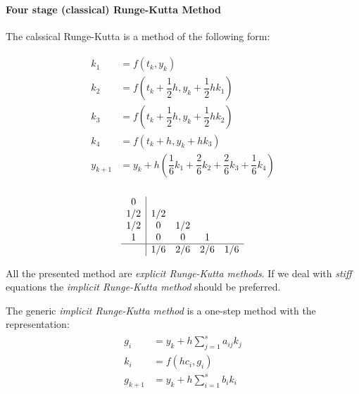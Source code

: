 \paragraph{Four stage (classical) Runge-Kutta Method}
The calssical Runge-Kutta is a method of the following form:

\begin{minipage}{0.45\textwidth}
	\begin{equation*}
	\begin{split}
	\begin{aligned}
	k_1 &= f(t_k,y_k) \\
	k_2 &= f\left( t_k+\dfrac{1}{2}h,y_k+\dfrac{1}{2}hk_1 \right) \\
	k_3 &= f\left( t_k+\dfrac{1}{2}h,y_k+\dfrac{1}{2}hk_2 \right) \\
	k_4 &= f\left( t_k+h,y_k+hk_3 \right) \\
	y_{k+1} &= y_k + h\left( \dfrac{1}{6}k_1 + \dfrac{2}{6}k_2 + \dfrac{2}{6}k_3 + \dfrac{1}{6}k_4 \right) \\
	\end{aligned}
	\end{split}
	\label{eq::4stage_rungekutta}
	\end{equation*}
\end{minipage}
\begin{minipage}{0.45\textwidth}
	\begin{equation}
	\begin{array}
	{c|cccc}
	0      & \\
	1/2    & 1/2 &  \\
	1/2    & 0 & 1/2 \\
	1      & 0 & 0 & 1 \\ \hline
	& 1/6  & 2/6 & 2/6 & 1/6
	\end{array}
	\end{equation}
\end{minipage}

All the presented method are \textit{explicit Runge-Kutta methods}. If we deal with \textit{stiff} equations the \textit{implicit Runge-Kutta method} should be preferred.

The generic \textit{implicit Runge-Kutta method} is a one-step method with the representation:
\begin{equation}
	\begin{split}
	\begin{aligned}
	g_i &= y_k + h\sum_{j=1}^{s}a_{ij}k_j \\
	k_i &= f(hc_i,g_i) \\
	g_{k+1} &= y_k + h\sum_{i=1}^{s}b_{i}k_i
	\end{aligned}
	\end{split}
	\label{eq::rungekutta_implicit}
\end{equation}

